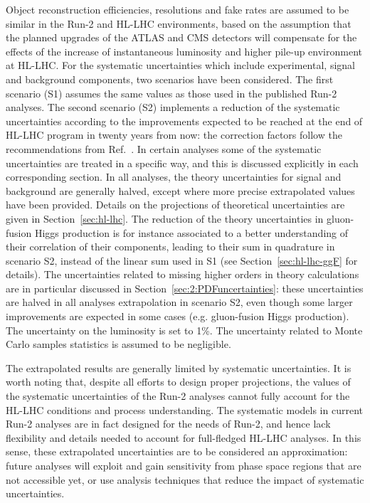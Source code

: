 Object reconstruction efficiencies, resolutions and fake rates are assumed to be similar in the Run-2 and HL-LHC environments, based on the assumption that the planned upgrades of the ATLAS and CMS detectors will compensate for the effects of the increase of instantaneous luminosity and higher pile-up environment at HL-LHC.
For the systematic uncertainties which include experimental, signal and background components, two scenarios have been considered.
The first scenario (S1) assumes the same values as those used in the published Run-2 analyses.
The second scenario (S2) implements a reduction of the systematic uncertainties according to the improvements expected to be reached at the end of HL-LHC program in twenty years from now: the correction factors follow the recommendations from Ref.~\cite{HLHELHCCommonSystematics}.
In certain analyses some of the systematic uncertainties are treated in a specific way, and this is discussed explicitly in each corresponding section.
%
In all analyses, the theory uncertainties for signal and background are generally halved, except where more precise extrapolated values have been provided. Details on the projections of theoretical uncertainties are given in Section~\ref{sec:hl-lhc}. The reduction of the theory uncertainties in gluon-fusion Higgs production is for instance associated to a better understanding of their correlation of their components, leading to their sum in quadrature in scenario S2, instead of the linear sum used in S1 (see Section~\ref{sec:hl-lhc-ggF} for details). The uncertainties related to missing higher orders in theory calculations are in particular discussed in Section~\ref{sec:2:PDFuncertainties}: these uncertainties are halved in all analyses extrapolation in scenario S2, even though some larger improvements are expected in some cases (e.g. gluon-fusion Higgs production).
%
The uncertainty on the luminosity is set to 1\%.
The uncertainty related to Monte Carlo samples statistics is assumed to be negligible.

The extrapolated results are generally limited by systematic uncertainties. It is worth noting that, despite all efforts to design proper projections, the values of the systematic uncertainties of the Run-2 analyses cannot fully account for the HL-LHC conditions and process understanding. The systematic models in current Run-2 analyses are in fact designed for the needs of Run-2, and hence lack flexibility and details needed to account for full-fledged HL-LHC analyses. In this sense, these extrapolated uncertainties are to be considered an approximation: future analyses will exploit and gain sensitivity from phase space regions that are not accessible yet, or use analysis techniques that reduce the impact of systematic uncertainties.


